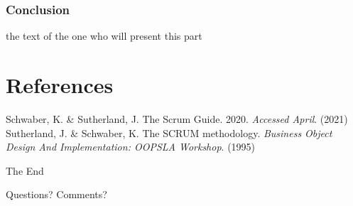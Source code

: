 \documentclass[
	11pt, %
]{beamer}
\begin{document}
\begin{frame}
	\frametitle{Conclusion}
	the text of the one who will present this part
\end{frame}

\section{References}

\begin{frame}[allowframebreaks] %
	\begin{thebibliography}{99}
		Schwaber, K. \& Sutherland, J. The Scrum Guide. 2020. {\em Accessed April}. (2021)
        Sutherland, J. \& Schwaber, K. The SCRUM methodology. {\em Business Object Design And Implementation: OOPSLA Workshop}. (1995)
	\end{thebibliography}
\end{frame}



\begin{frame}[plain] %
	\begin{center}
		{\Huge The End}

		\bigskip\bigskip %

		{\LARGE Questions? Comments?}
	\end{center}
\end{frame}

\end{document}
